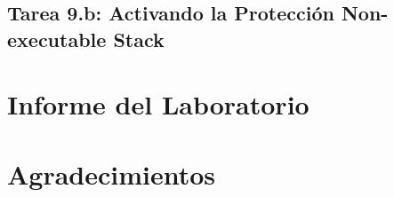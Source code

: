 \subsection{Tarea 9.b: Activando la Protección Non-executable Stack}





\section{Informe del Laboratorio}




\section*{Agradecimientos}




